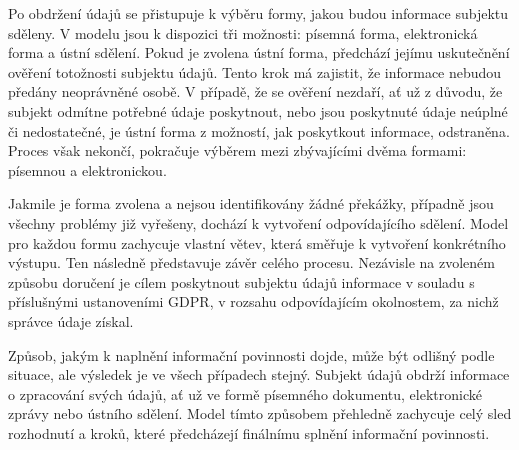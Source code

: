 \begin{itemize}
  Po obdržení údajů se přistupuje k výběru formy, jakou budou informace subjektu sděleny. V modelu jsou k dispozici tři možnosti: písemná forma, elektronická forma a ústní sdělení. Pokud je zvolena ústní forma, předchází jejímu uskutečnění ověření totožnosti subjektu údajů. Tento krok má zajistit, že informace nebudou předány neoprávněné osobě. V případě, že se ověření nezdaří, ať už z důvodu, že subjekt odmítne potřebné údaje poskytnout, nebo jsou poskytnuté údaje neúplné či nedostatečné, je ústní forma z možností, jak poskytkout informace, odstraněna. Proces však nekončí, pokračuje výběrem mezi zbývajícími dvěma formami: písemnou a elektronickou.

  Jakmile je forma zvolena a nejsou identifikovány žádné překážky, případně jsou všechny problémy již vyřešeny, dochází k vytvoření odpovídajícího sdělení. Model pro každou formu zachycuje vlastní větev, která směřuje k vytvoření konkrétního výstupu. Ten následně představuje závěr celého procesu. Nezávisle na zvoleném způsobu doručení je cílem poskytnout subjektu údajů informace v souladu s příslušnými ustanoveními GDPR, v rozsahu odpovídajícím okolnostem, za nichž správce údaje získal.

  Způsob, jakým k naplnění informační povinnosti dojde, může být odlišný podle situace, ale výsledek je ve všech případech stejný. Subjekt údajů obdrží informace o zpracování svých údajů, ať už ve formě písemného dokumentu, elektronické zprávy nebo ústního sdělení. Model tímto způsobem přehledně zachycuje celý sled rozhodnutí a kroků, které předcházejí finálnímu splnění informační povinnosti.


\end{itemize}
